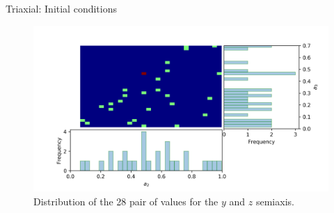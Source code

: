 \documentclass{beamer}
\begin{document}
\begin{frame}{Triaxial: Initial conditions}
	\begin{figure}[h]
		\centering
		\includegraphics[width = 0.9\linewidth]{"../Files/Week 13/triaxial_axes"}
		\caption{Distribution of the 28 pair of values for the $y$ and $z$ semiaxis.}
		\label{fig: semiaxisDist}
	\end{figure}
\end{frame}
\end{document}
